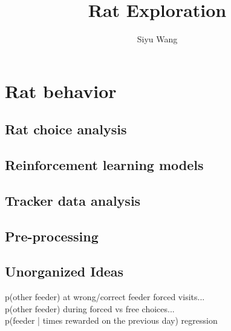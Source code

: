 \documentclass{article}
\title{Rat Exploration}
\author{Siyu Wang}
\date{ }
\begin{document}
  
\maketitle
  
\tableofcontents

\section{Rat behavior}
\subsection{Rat choice analysis}
\subsection{Reinforcement learning models}
\subsection{Tracker data analysis}
\subsection{Pre-processing}
\subsection{Unorganized Ideas}
p(other feeder) at wrong/correct feeder forced visits...\\
p(other feeder) during forced vs free choices...\\
p(feeder | times rewarded on the previous day) regression\\

 
\end{document}
